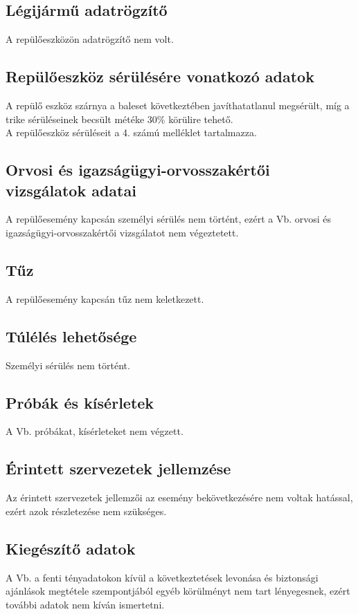 \documentclass[a4paper,10pt]{article}
\begin{document}
\pagebreak
\subsection{Légijármű adatrögzítő}
A repülőeszközön adatrögzítő nem volt.

\subsection{Repülőeszköz sérülésére vonatkozó adatok}
A repülő eszköz szárnya a baleset következtében javíthatatlanul megsérült, 
míg a trike sérüléseinek becsült météke 30\% körülire tehető.\\
A repülőeszköz sérüléseit a 4. számú melléklet tartalmazza.

\subsection{Orvosi és igazságügyi-orvosszakértői vizsgálatok adatai}
A repülőesemény kapcsán személyi sérülés nem történt, ezért a Vb. orvosi és 
igazságügyi-orvosszakértői vizsgálatot nem végeztetett.

\subsection{Tűz}
A repülőesemény kapcsán tűz nem keletkezett.

\subsection{Túlélés lehetősége}
Személyi sérülés nem történt.

\subsection{Próbák és kísérletek}
A Vb. próbákat, kísérleteket nem végzett.

\subsection{Érintett szervezetek jellemzése}
Az érintett szervezetek jellemzői az esemény bekövetkezésére nem voltak 
hatással, ezért azok részletezése nem szükséges.

\subsection{Kiegészítő adatok}
A Vb. a fenti tényadatokon kívül a következtetések levonása és biztonsági 
ajánlások megtétele szempontjából egyéb körülményt nem tart lényegesnek,
ezért további adatok nem kíván ismertetni.
\end{document}
